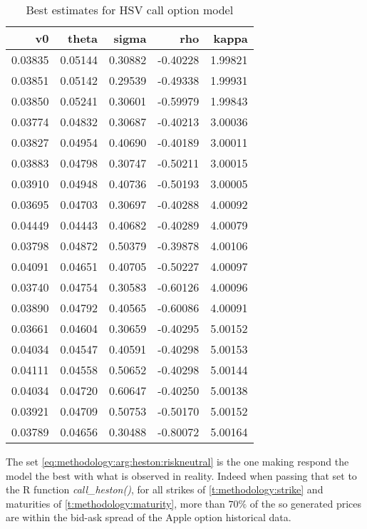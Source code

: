 \documentclass[12pt]{report}
\begin{document}
\begin{table}[ht]
\centering
\begin{tabular}{rrrrr}
  \hline
v0 & theta & sigma & rho & kappa \\ 
  \hline
0.03835 & 0.05144 & 0.30882 & -0.40228 & 1.99821 \\ 
  0.03851 & 0.05142 & 0.29539 & -0.49338 & 1.99931 \\ 
  0.03850 & 0.05241 & 0.30601 & -0.59979 & 1.99843 \\ 
  0.03774 & 0.04832 & 0.30687 & -0.40213 & 3.00036 \\ 
  0.03827 & 0.04954 & 0.40690 & -0.40189 & 3.00011 \\ 
  0.03883 & 0.04798 & 0.30747 & -0.50211 & 3.00015 \\ 
  0.03910 & 0.04948 & 0.40736 & -0.50193 & 3.00005 \\ 
  0.03695 & 0.04703 & 0.30697 & -0.40288 & 4.00092 \\ 
  0.04449 & 0.04443 & 0.40682 & -0.40289 & 4.00079 \\ 
  0.03798 & 0.04872 & 0.50379 & -0.39878 & 4.00106 \\ 
  0.04091 & 0.04651 & 0.40705 & -0.50227 & 4.00097 \\ 
  0.03740 & 0.04754 & 0.30583 & -0.60126 & 4.00096 \\ 
  0.03890 & 0.04792 & 0.40565 & -0.60086 & 4.00091 \\ 
  0.03661 & 0.04604 & 0.30659 & -0.40295 & 5.00152 \\ 
  0.04034 & 0.04547 & 0.40591 & -0.40298 & 5.00153 \\ 
  0.04111 & 0.04558 & 0.50652 & -0.40298 & 5.00144 \\ 
  0.04034 & 0.04720 & 0.60647 & -0.40250 & 5.00138 \\ 
  0.03921 & 0.04709 & 0.50753 & -0.50170 & 5.00152 \\ 
  0.03789 & 0.04656 & 0.30488 & -0.80072 & 5.00164 \\ 
   \hline
\end{tabular}
\caption{Best estimates for HSV call option model} 
\label{t:methodology:call:heston:estimate1}
\end{table}

The set \ref{eq:methodology:arg:heston:riskneutral} is the one making respond the model the best with what is observed in reality.
Indeed when passing that set to the R function \textit{call\_heston()}, for all strikes of \cref{t:methodology:strike} and maturities of \cref{t:methodology:maturity}, more than $70\%$ of the so generated prices are within the bid-ask spread of the Apple option historical data.
\end{document}
